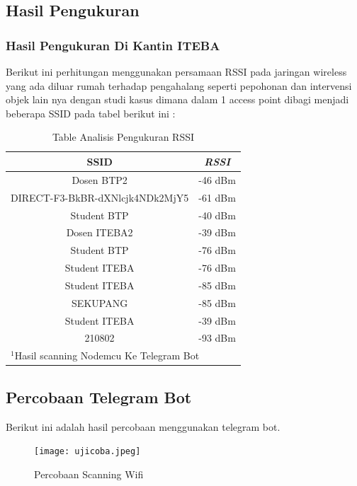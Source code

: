 \documentclass[conference]{IEEEtran}
\begin{document}
    \subsection{Hasil Pengukuran}
    
        \subsubsection{Hasil Pengukuran Di Kantin ITEBA}
        Berikut ini perhitungan menggunakan persamaan RSSI 
    pada jaringan wireless yang ada diluar rumah
     terhadap pengahalang seperti pepohonan dan intervensi objek lain nya dengan studi kasus dimana dalam 1 access
     point dibagi menjadi beberapa SSID pada tabel berikut ini : 
    
     \begin{table}[htbp]
        \caption{Table Analisis Pengukuran RSSI}
        \begin{center}
        \begin{tabular}{|c|c|}
            \hline
        \textbf{SSID} &  \textbf{\textit{RSSI}} \\
        \hline
       Dosen BTP2  &  -46 dBm   \\
        \hline
        DIRECT-F3-BkBR-dXNlcjk4NDk2MjY5 &  -61 dBm   \\
        \hline
        Student BTP & -40 dBm   \\
        \hline
        Dosen ITEBA2  &  -39 dBm   \\
        \hline
        Student BTP  & -76 dBm   \\
        \hline
        Student ITEBA & -76 dBm   \\
        \hline
        Student ITEBA  &  -85 dBm   \\
        \hline
        SEKUPANG  &  -85 dBm   \\
        \hline
        Student ITEBA  &  -39 dBm   \\
        \hline
        210802  &  -93 dBm   \\
        \hline
      
    
        \multicolumn{2}{l}{$^{\mathrm{1}}$Hasil scanning Nodemcu Ke Telegram Bot}
        \end{tabular}
        \label{tab1}
        \end{center}
        \end{table}
    

        \subsection{Percobaan Telegram Bot}
        Berikut ini adalah hasil percobaan menggunakan telegram bot.
        \begin{figure}[h]
            \centering
            \texttt{[image: ujicoba.jpeg]}
            \caption{Percobaan Scanning Wifi}
        \end{figure}       
    
\end{document}
